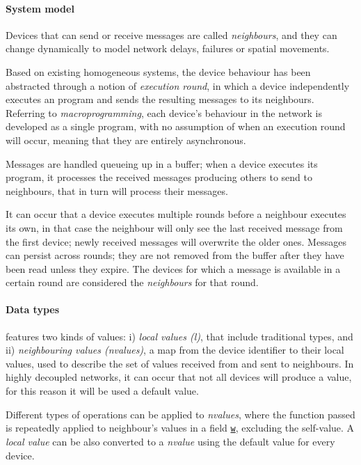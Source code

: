 
\paragraph{System model}
Devices that can send or receive messages are called \emph{neighbours}, and they can change dynamically to model network
delays, failures or spatial movements.

Based on existing homogeneous systems, the device behaviour has been abstracted through a notion of \emph{execution round},
in which a device independently executes an \xc{} program and sends the resulting messages to its neighbours.
Referring to \emph{macroprogramming}, each device's behaviour in the network is developed as a single program, with no
assumption of when an execution round will occur, meaning that they are entirely asynchronous.

Messages are handled queueing up in a buffer; when a device executes its \xc{} program, it processes the received
messages producing others to send to neighbours, that in turn will process their messages.

It can occur that a device executes multiple rounds before a neighbour executes its own, in that case the neighbour will
only see the last received message from the first device; newly received messages will overwrite the older ones.
Messages can persist across rounds; they are not removed from the buffer after they have been read unless they expire.
The devices for which a message is available in a certain round are considered the \emph{neighbours} for that round.

\paragraph{Data types}
\xc{} features two kinds of values:
    i) \emph{local values (l)}, that include traditional types, and
    ii) \emph{neighbouring values (nvalues)}, a map from the device identifier to their local values, used to describe
        the set of values received from and sent to neighbours.
In highly decoupled networks, it can occur that not all devices will produce a value, for this reason it will be used
a default value.

Different types of operations can be applied to \emph{nvalues}, where the function passed is repeatedly applied to
neighbour's values in a field \texttt{\underline{w}}, excluding the self-value.
A \emph{local value} can be also converted to a \emph{nvalue} using the default value for every device.

